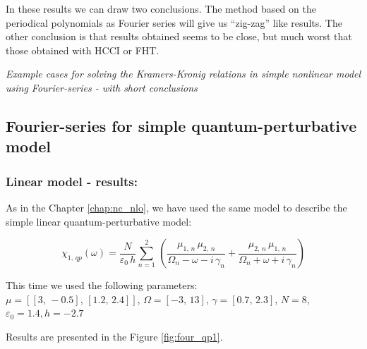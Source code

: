 \documentclass[12pt,twoside,a4paper]{article}
\numberwithin{equation}{subsection}
\numberwithin{figure}{subsection}
\begin{document}
In these results we can draw two conclusions. The method based on the periodical polynomials as Fourier series will
give us ``zig-zag'' like results. The other conclusion is that results obtained seems to be close, but much worst that those
obtained with HCCI or FHT. 

\textit{Example cases for solving the Kramers-Kronig relations in simple nonlinear model using Fourier-series - with short
conclusions}

\subsection{Fourier-series for simple quantum-perturbative model} \label{chap:fourier_quantum}

\subsubsection*{Linear model - results:}

As in the Chapter \ref{chap:nc_nlo}, we have used the same model to describe the simple linear quantum-perturbative model: 

\begin{equation} \label{eq:four_qp}
  {\chi_{1, \,qp}}(\omega ) = \frac {N}{\varepsilon_0\,h} \sum_{n=1}^{2}\,(\frac {{\mu_{1, \,n}}\,{ \mu_{2, \,n}}}{{\Omega_{n}}
  - \omega  - i\,{\gamma_{n}}} + \frac {{\mu_{2, \,n}}\,{\mu_{1, \,n}}}{{\Omega_{n}} + \omega + i\,{\gamma_{n}}})
\end{equation}

This time we used the following parameters: \\
$\mu = [[3, \, - 0.5], \,[1.2, \,2.4]]$, 
$\Omega =[ - 3, \,13]$, 
$\gamma =[0.7, \,2.3]$,  
$N=8$, 
${\varepsilon_{0}}=1.4, 
h= - 2.7$

Results are presented in the Figure \ref{fig:four_qp1}. 
\end{document}
